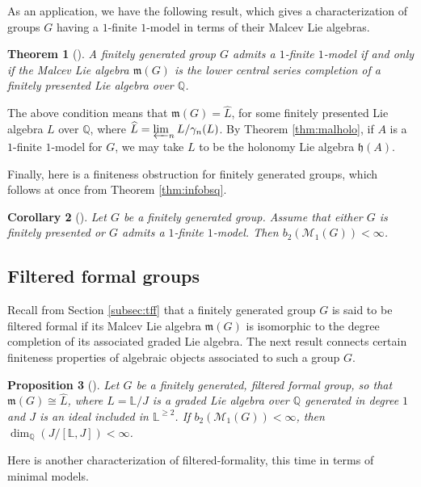 \documentclass{article}
\numberwithin{equation}{section}
\newtheorem{theorem}{Theorem}[section]
\newtheorem{corollary}[theorem]{Corollary}
\newtheorem{proposition}[theorem]{Proposition}
\theoremstyle{definition}
\newcommand{\Q}{\mathbb{Q}}
\renewcommand{\L}{\mathbb{L}}
\newcommand{\M}{\mathcal{M}}
\newcommand{\h}{{\mathfrak{h}}}
\newcommand{\m}{{\mathfrak{m}}}
\begin{document}
As an application, we have the following result, 
which gives a characterization of groups $G$ having a $1$-finite 
$1$-model in terms of their Malcev Lie algebras.

\begin{theorem}[\cite{PS-jlms}]
\label{thm:psobs}
A finitely generated group $G$ admits a $1$-finite $1$-model if and 
only if the Malcev Lie algebra $\m(G)$ is the lower central series 
completion of a finitely presented Lie algebra over $\Q$.
\end{theorem}

The above condition means that $\m(G)=\widehat{L}$, for some finitely presented 
Lie algebra $L$ over $\Q$, where $\widehat{L}=\varprojlim_{n} L/\gamma_n (L)$. 
By Theorem \ref{thm:malholo}, if $A$ is a $1$-finite $1$-model for $G$, 
we may take $L$ to be the holonomy Lie algebra $\h(A)$. 

Finally, here is a finiteness obstruction for finitely generated groups, which 
follows at once from Theorem \ref{thm:infobsq}.

\begin{corollary}[\cite{PS-jlms}]
\label{cor:infobs1}
Let $G$ be a finitely generated group. Assume that either $G$ is finitely presented 
or $G$ admits a $1$-finite $1$-model. Then $b_2(\M_1(G))< \infty$.
\end{corollary}

\subsection{Filtered formal groups}
\label{subsec:filtered-formal} 

Recall from Section \ref{subsec:tff} that a finitely generated group $G$ 
is said to be filtered formal if its Malcev Lie algebra $\m(G)$ is isomorphic to 
the degree completion of its associated graded Lie algebra. 
The next result connects certain finiteness properties of algebraic 
objects associated to such a group $G$. 

\begin{proposition}[\cite{PS-jlms}]
\label{prop:filtf}
Let $G$ be a finitely generated, filtered formal group, so that 
$\m (G) \cong \widehat{L}$, where $L=\L/J$ is a graded Lie algebra 
over $\Q$ generated in degree $1$ and $J$ is an ideal included in $\L^{\ge 2}$.  
If $b_2(\M_1(G))< \infty$, then $\dim_{\Q} (J/[\L, J] )< \infty$.
\end{proposition}

Here is another characterization of filtered-formality, this time in 
terms of minimal models. 
\end{document}
